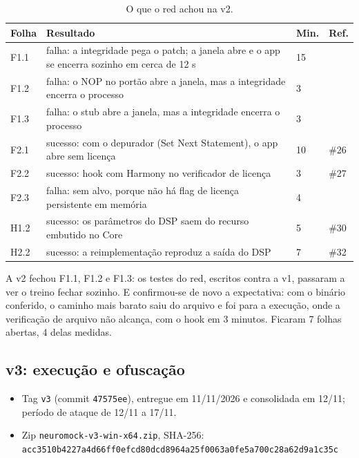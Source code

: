 \begin{table}[htbp]
\centering
\caption{O que o red achou na v2.}
\label{qd:v2}
\small
\begin{tabular}{L{1.2cm}L{10.2cm}L{1.2cm}L{1.2cm}}
\toprule
Folha & Resultado & Min. & Ref. \\
\midrule
F1.1 & falha: a integridade pega o patch; a janela abre e o app se encerra sozinho em cerca de 12 s & 15 & \\
F1.2 & falha: o NOP no portão abre a janela, mas a integridade encerra o processo & 3 & \\
F1.3 & falha: o stub abre a janela, mas a integridade encerra o processo & 3 & \\
F2.1 & sucesso: com o depurador (Set Next Statement), o app abre sem licença & 10 & \#26 \\
F2.2 & sucesso: hook com Harmony no verificador de licença & 3 & \#27 \\
F2.3 & falha: sem alvo, porque não há flag de licença persistente em memória & 4 & \\
H1.2 & sucesso: os parâmetros do DSP saem do recurso embutido no Core & 5 & \#30 \\
H2.2 & sucesso: a reimplementação reproduz a saída do DSP & 7 & \#32 \\
\bottomrule
\end{tabular}
\end{table}

A v2 fechou F1.1, F1.2 e F1.3: os testes do red, escritos contra a v1, passaram a ver o treino fechar sozinho. E confirmou-se de novo a expectativa: com o binário conferido, o caminho mais barato saiu do arquivo e foi para a execução, onde a verificação de arquivo não alcança, com o hook em 3 minutos. Ficaram 7 folhas abertas, 4 delas medidas.

\subsection{v3: execução e ofuscação}

\begin{itemize}[noitemsep]
\item Tag \texttt{v3} (commit \texttt{47575ee}), entregue em 11/11/2026 e consolidada em 12/11; período de ataque de 12/11 a 17/11.
\item Zip \texttt{neuromock-v3-win-x64.zip}, SHA-256:\\ \texttt{\footnotesize acc3510b4227a4d66ff0efcd80dcd8964a25f0063a0fe5a700c28a62d9a1c35c}
\end{itemize}

